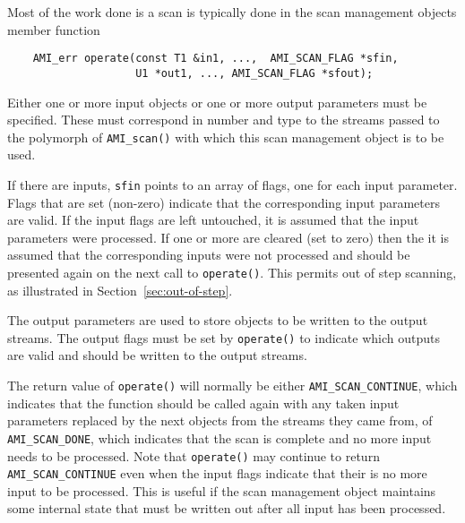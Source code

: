 Most of the work done is a scan is typically done in the scan management
objects member function
\begin{verbatim}
    AMI_err operate(const T1 &in1, ...,  AMI_SCAN_FLAG *sfin,
                    U1 *out1, ..., AMI_SCAN_FLAG *sfout);
\end{verbatim}

Either one or more input objects or one or more output parameters must
be specified.  These must correspond in number and type to the streams
passed to the polymorph of \verb|AMI_scan()| with which this scan
management object is to be used.

If there are inputs, \verb|sfin| points to an array of flags, one for each
input parameter.  Flags that are set (non-zero) indicate that the
corresponding input parameters are valid.  If the input flags are left
untouched, it is assumed that the input parameters were processed.  If one
or more are cleared (set to zero) then the it is assumed that the
corresponding inputs were not processed and should be presented again on
the next call to \verb|operate()|.  This permits out of step
scanning, as illustrated in
Section~\ref{sec:out-of-step}.

The output parameters are used to store objects to be written to the output
streams. The output flags must be set by \verb|operate()| to indicate which
outputs are valid and should be written to the output streams. 

The return value of \verb|operate()| will normally be either
\verb|AMI_SCAN_CONTINUE|, which indicates that the function should be
called again with any taken input parameters replaced by the next objects
from the streams they came from, of \verb|AMI_SCAN_DONE|, which indicates
that the scan is complete and no more input needs to be processed.  Note
that \verb|operate()| may continue to return \verb|AMI_SCAN_CONTINUE| even
when the input flags indicate that their is no more input to be processed.
This is useful if the scan management object maintains some internal state
that must be written out after all input has been processed.






